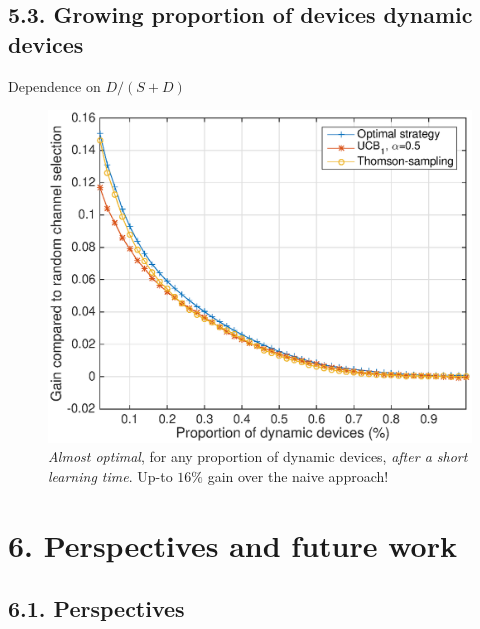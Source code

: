 \documentclass[12pt,english,ignorenonframetext,aspectratio=169,]{beamer}
\begin{document}
\subsection{\hfill{}5.3. Growing proportion of devices dynamic devices\hfill{}}

\begin{frame}{Dependence on \(D/(S+D)\)}

\begin{figure}[h!]
\centering
\includegraphics[height=0.65\textheight]{perf_learning.eps}
\caption{\small{\emph{Almost optimal}, for any proportion of dynamic devices, \emph{after a short learning time}. Up-to $16\%$ gain over the naive approach!}}
\end{figure}

\end{frame}



\section{\hfill{}6. Perspectives and future work\hfill{}}

\subsection{\hfill{}6.1. Perspectives\hfill{}}
\end{document}
